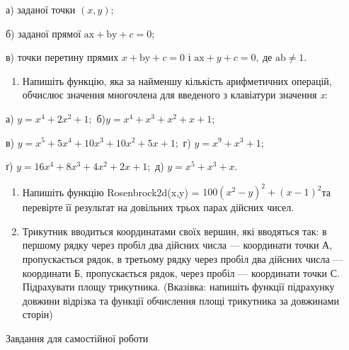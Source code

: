 \documentclass[]{article}
\begin{document}
а) заданої точки \((x,y);\)

б) заданої прямої \(\mathrm{\text{ax}} + \mathrm{\text{by}} + c = 0\);

в) точки перетину прямих \(x + \mathrm{\text{by}} + c = 0\) і
\(\mathrm{\text{ax}} + y + c = 0,\ \)де
\(\mathrm{\text{ab}} \neq 1\mathrm{.}\)

\begin{enumerate}
\def\labelenumi{\arabic{enumi})}
\item
  Напишіть функцію, яка за найменшу кількість арифметичних операцій,
  обчислює значення многочлена для введеного з клавіатури значення
  \emph{x}:
\end{enumerate}

а) \(y = x^{4} + 2x^{2} + 1;\) б)\(y = x^{4} + x^{3} + x^{2} + x + 1;\)

в)
\(y = x^{5} + 5x^{4} + \mathrm{10}x^{3} + \mathrm{10}x^{2} + 5x + 1;\)
г) \(y = x^{9} + x^{3} + 1;\)

ґ) \(y = \mathrm{16}x^{4} + 8x^{3} + 4x^{2} + 2x + 1;\) д)
\(y = x^{5} + x^{3} + x\mathrm{.}\)

\begin{enumerate}
\def\labelenumi{\arabic{enumi})}
\item
  Напишіть функцію Rosenbrock2d(x,y) =
  \(100(x^{2} - y)^{2} + (x - 1)^{2}\)та перевірте її результат на
  довільних трьох парах дійсних чисел.
\item
  Трикутник вводиться координатами своїх вершин, які вводяться так: в
  першому рядку через пробіл два дійсних числа --- координати точки А,
  пропускається рядок, в третьому рядку через пробіл два дійсних числа
  --- координати Б, пропускається рядок, через пробіл --- координати
  точки С. Підрахувати площу трикутника. (Вказівка: напишіть функції
  підрахунку довжини відрізка та функції обчислення площі трикутника за
  довжинами сторін)
\end{enumerate}

Завдання для самостійної роботи
\end{document}
